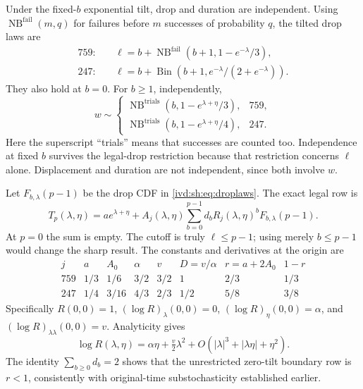\documentclass[11pt,letterpaper]{article}
\theoremstyle{remark}\newtheorem{remark}[theorem]{Remark}
\numberwithin{equation}{section}
\DeclareMathOperator{\NB}{NB}\DeclareMathOperator{\Bin}{Bin}
\begin{document}
Under the fixed-$b$ exponential tilt, drop and duration are independent.
Using $\NB^{\mathrm{fail}}(m,q)$ for failures before $m$ successes
of probability $q$, the tilted drop laws are
\begin{align}
 759:\quad &\ell=b+\NB^{\mathrm{fail}}(b+1,1-e^{-\lambda}/3),\\
 247:\quad &\ell=b+\Bin(b+1,e^{-\lambda}/(2+e^{-\lambda})).
 \label{ivd:sh:eq:droplaws}
\end{align}
They also hold at $b=0$. For $b\ge1$, independently,
\begin{equation}\label{ivd:sh:eq:durationlaws}
 w\sim\begin{cases}
 \NB^{\mathrm{trials}}(b,1-e^{\lambda+\eta}/3),&759,\\
 \NB^{\mathrm{trials}}(b,1-e^{\lambda+\eta}/4),&247.
 \end{cases}
\end{equation}
Here the superscript ``trials'' means that successes are counted too.
Independence at fixed $b$ survives the legal-drop restriction because
that restriction concerns $\ell$ alone. Displacement and duration
are not independent, since both involve $w$.

Let $F_{b,\lambda}(p-1)$ be the drop CDF in \eqref{ivd:sh:eq:droplaws}.
The exact legal row is
\begin{equation}\label{ivd:sh:eq:legalrow}
 T_p(\lambda,\eta)=a e^{\lambda+\eta}
  +A_j(\lambda,\eta)\sum_{b=0}^{p-1}
      d_b R_j(\lambda,\eta)^b F_{b,\lambda}(p-1).
\end{equation}
At $p=0$ the sum is empty. The cutoff is truly $\ell\le p-1$;
using merely $b\le p-1$ would change the sharp result.
The constants and derivatives at the origin are
\begin{equation}\label{ivd:sh:eq:constants}
\begin{array}{c|ccccccc}
 j&a&A_0&\alpha&v&D=v/\alpha&r=a+2A_0&1-r\\\hline
 759&1/3&1/6&3/2&3/2&1&2/3&1/3\\
 247&1/4&3/16&4/3&2/3&1/2&5/8&3/8
\end{array}
\end{equation}
Specifically $R(0,0)=1$, $(\log R)_\lambda(0,0)=0$,
$(\log R)_\eta(0,0)=\alpha$, and
$(\log R)_{\lambda\lambda}(0,0)=v$. Analyticity gives
\begin{equation}\label{ivd:sh:eq:jointtaylor}
 \log R(\lambda,\eta)=\alpha\eta+\tfrac v2\lambda^2
  +O(|\lambda|^3+|\lambda\eta|+\eta^2).
\end{equation}
The identity $\sum_{b\ge0}d_b=2$ shows that the unrestricted
zero-tilt boundary row is $r<1$, consistently with original-time
substochasticity established earlier.
\end{document}
